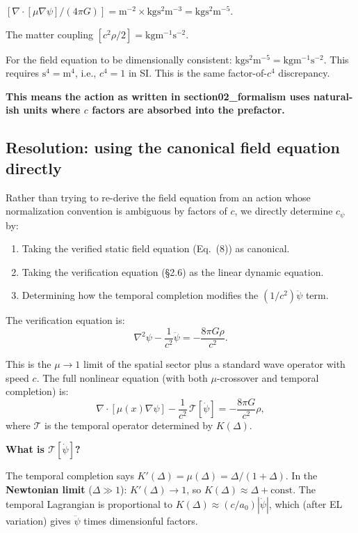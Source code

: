 \documentclass[11pt]{article}
\begin{document}
$[\nabla\cdot[\mu\nabla\psi]/(4\pi G)] = \text{m}^{-2} \times
\text{kg}\text{s}^2\text{m}^{-3} = \text{kg}\text{s}^2\text{m}^{-5}$.

The matter coupling $[c^2\rho/2] = \text{kg}\text{m}^{-1}\text{s}^{-2}$.

For the field equation to be dimensionally consistent:
$\text{kg}\text{s}^2\text{m}^{-5} = \text{kg}\text{m}^{-1}\text{s}^{-2}$.
This requires $\text{s}^4 = \text{m}^4$, i.e., $c^4 = 1$ in SI. This
is the same factor-of-$c^4$ discrepancy.

\textbf{This means the action as written in section02\_formalism uses
natural-ish units where $c$ factors are absorbed into the prefactor.}

\subsection{Resolution: using the canonical field equation directly}

Rather than trying to re-derive the field equation from an action whose
normalization convention is ambiguous by factors of $c$, we directly
determine $c_\psi$ by:
\begin{enumerate}
\item Taking the verified static field equation (Eq.~(8)) as canonical.
\item Taking the verification equation (\S2.6) as the linear dynamic equation.
\item Determining how the temporal completion modifies the $(1/c^2)\ddot\psi$
  term.
\end{enumerate}

The verification equation is:
\begin{equation}
\nabla^2\psi - \frac{1}{c^2}\ddot\psi = -\frac{8\pi G\rho}{c^2}.
\label{eq:linear-dynamic}
\end{equation}

This is the $\mu \to 1$ limit of the spatial sector plus a standard
wave operator with speed $c$. The full nonlinear equation (with both
$\mu$-crossover and temporal completion) is:
\begin{equation}
\nabla\cdot[\mu(x)\nabla\psi]
- \frac{1}{c^2}\,\mathcal{T}[\dot\psi]
= -\frac{8\pi G}{c^2}\rho,
\label{eq:full-dynamic}
\end{equation}
where $\mathcal{T}$ is the temporal operator determined by $K(\Delta)$.

\textbf{What is $\mathcal{T}[\dot\psi]$?}

The temporal completion says $K'(\Delta) = \mu(\Delta) = \Delta/(1+\Delta)$.
In the \textbf{Newtonian limit} ($\Delta \gg 1$): $K'(\Delta) \to 1$,
so $K(\Delta) \approx \Delta + \text{const}$. The temporal Lagrangian
is proportional to $K(\Delta) \approx (c/a_0)|\dot\psi|$, which
(after EL variation) gives $\ddot\psi$ times dimensionful factors.
\end{document}
